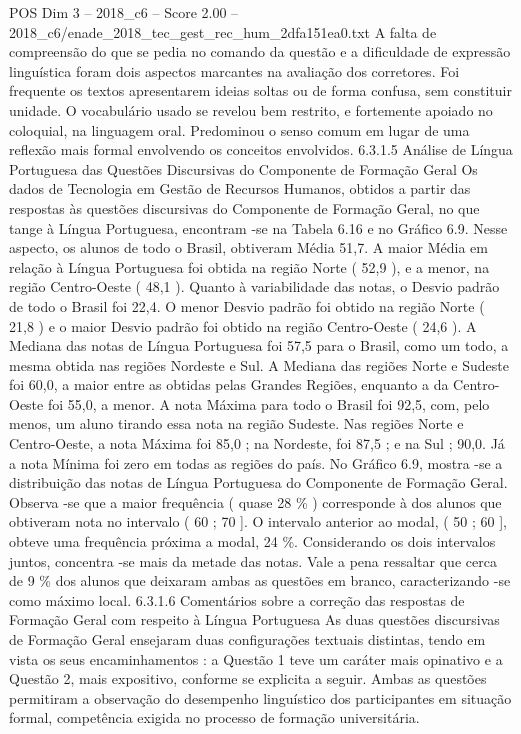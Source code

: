 \begin{textsample}{POS Dim 3 – 2018\_c6 – Score 2.00 – 2018\_c6/enade\_2018\_tec\_gest\_rec\_hum\_2dfa151ea0.txt}
A falta de compreensão do que se pedia no comando da questão e a dificuldade de expressão linguística foram dois aspectos marcantes na avaliação dos corretores.
Foi frequente os textos apresentarem ideias soltas ou de forma confusa, sem constituir unidade.
O vocabulário usado se revelou bem restrito, e fortemente apoiado no coloquial, na linguagem oral.
Predominou o senso comum em lugar de uma reflexão mais formal envolvendo os conceitos envolvidos. 6.3.1.5 Análise de Língua Portuguesa das Questões Discursivas do Componente de Formação Geral Os dados de Tecnologia em Gestão de Recursos Humanos, obtidos a partir das respostas às questões discursivas do Componente de Formação Geral, no que tange à Língua Portuguesa, encontram -se na Tabela 6.16 e no Gráfico 6.9.
Nesse aspecto, os alunos de todo o Brasil, obtiveram Média 51,7.
A maior Média em relação à Língua Portuguesa foi obtida na região Norte ( 52,9 ), e a menor, na região Centro-Oeste ( 48,1 ).
Quanto à variabilidade das notas, o Desvio padrão de todo o Brasil foi 22,4.
O menor Desvio padrão foi obtido na região Norte ( 21,8 ) e o maior Desvio padrão foi obtido na região Centro-Oeste ( 24,6 ).
A Mediana das notas de Língua Portuguesa foi 57,5 para o Brasil, como um todo, a mesma obtida nas regiões Nordeste e Sul.
A Mediana das regiões Norte e Sudeste foi 60,0, a maior entre as obtidas pelas Grandes Regiões, enquanto a da Centro-Oeste foi 55,0, a menor.
A nota Máxima para todo o Brasil foi 92,5, com, pelo menos, um aluno tirando essa nota na região Sudeste.
Nas regiões Norte e Centro-Oeste, a nota Máxima foi 85,0 ; na Nordeste, foi 87,5 ; e na Sul ; 90,0.
Já a nota Mínima foi zero em todas as regiões do país.
No Gráfico 6.9, mostra -se a distribuição das notas de Língua Portuguesa do Componente de Formação Geral.
Observa -se que a maior frequência ( quase 28 \% ) corresponde à dos alunos que obtiveram nota no intervalo ( 60 ; 70 ].
O intervalo anterior ao modal, ( 50 ; 60 ], obteve uma frequência próxima a modal, 24 \%.
Considerando os dois intervalos juntos, concentra -se mais da metade das notas.
Vale a pena ressaltar que cerca de 9 \% dos alunos que deixaram ambas as questões em branco, caracterizando -se como máximo local. 6.3.1.6 Comentários sobre a correção das respostas de Formação Geral com respeito à Língua Portuguesa As duas questões discursivas de Formação Geral ensejaram duas configurações textuais distintas, tendo em vista os seus encaminhamentos : a Questão 1 teve um caráter mais opinativo e a Questão 2, mais expositivo, conforme se explicita a seguir.
Ambas as questões permitiram a observação do desempenho linguístico dos participantes em situação formal, competência exigida no processo de formação universitária.

\end{textsample}

